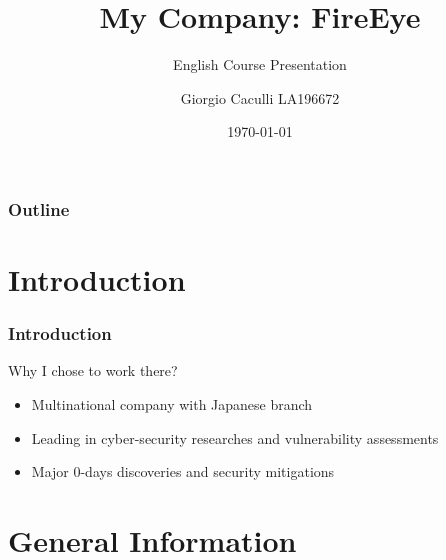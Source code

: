 \documentclass{beamer}
\title{My Company: FireEye}
\subtitle{English Course Presentation}
\author{Giorgio Caculli LA196672}
\institute{HELHa}
\date{\today}
\begin{document}
	\begin{frame}
		\titlepage
	\end{frame}
	\begin{frame}
		\frametitle{Outline}
		\tableofcontents
	\end{frame}
	\section{Introduction}
	\begin{frame}
		\frametitle{Introduction}
		Why I chose to work there?
		\begin{itemize}
			\item Multinational company with Japanese branch
			\item Leading in cyber-security researches and vulnerability assessments
			\item Major 0-days discoveries and security mitigations
		\end{itemize}
	\end{frame}
	\section{General Information}
\end{document}

